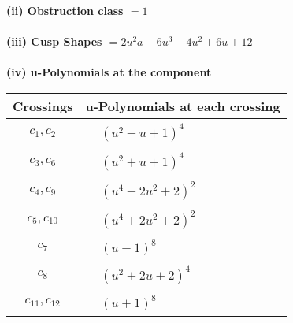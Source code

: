 \documentclass[1p]{elsarticle_modified}
\theoremstyle{definition}
\begin{document}
\flushleft \textbf{(ii) Obstruction class $= 1$}\\~\\
\flushleft \textbf{(iii) Cusp Shapes $= 2 u^2 a-6 u^3-4 u^2+6 u+12$}\\~\\
\newpage\renewcommand{\arraystretch}{1}
\flushleft \textbf{(iv) u-Polynomials at the component}\newline \\
\begin{tabular}{m{50pt}|m{274pt}}
Crossings & \hspace{64pt}u-Polynomials at each crossing \\
\hline $$\begin{aligned}c_{1},c_{2}\end{aligned}$$&$\begin{aligned}
&(u^2- u+1)^4
\end{aligned}$\\
\hline $$\begin{aligned}c_{3},c_{6}\end{aligned}$$&$\begin{aligned}
&(u^2+u+1)^4
\end{aligned}$\\
\hline $$\begin{aligned}c_{4},c_{9}\end{aligned}$$&$\begin{aligned}
&(u^4-2 u^2+2)^2
\end{aligned}$\\
\hline $$\begin{aligned}c_{5},c_{10}\end{aligned}$$&$\begin{aligned}
&(u^4+2 u^2+2)^2
\end{aligned}$\\
\hline $$\begin{aligned}c_{7}\end{aligned}$$&$\begin{aligned}
&(u-1)^8
\end{aligned}$\\
\hline $$\begin{aligned}c_{8}\end{aligned}$$&$\begin{aligned}
&(u^2+2 u+2)^4
\end{aligned}$\\
\hline $$\begin{aligned}c_{11},c_{12}\end{aligned}$$&$\begin{aligned}
&(u+1)^8
\end{aligned}$\\
\hline
\end{tabular}\\~\\
\end{document}
